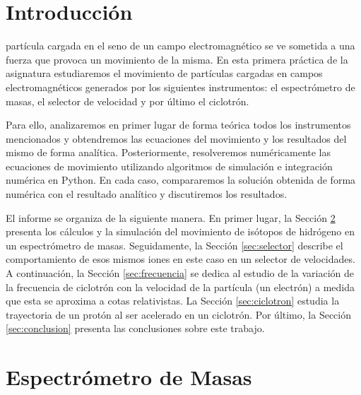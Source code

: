 \documentclass[journal]{IEEEtran}
\begin{document}
%
\IEEEpeerreviewmaketitle

\section{Introducción}

 partícula cargada en el seno de un campo electromagnético se ve sometida a una fuerza que provoca un movimiento de la misma. En esta primera práctica de la asignatura estudiaremos el movimiento de partículas cargadas en campos electromagnéticos generados por los siguientes instrumentos: el espectrómetro de masas, el selector de velocidad y por último el ciclotrón.

Para ello, analizaremos en primer lugar de forma teórica todos los instrumentos mencionados y obtendremos las ecuaciones del movimiento y los resultados del mismo de forma analítica. Posteriormente, resolveremos numéricamente las ecuaciones de movimiento utilizando algoritmos de simulación e integración numérica en Python. En cada caso, compararemos la solución obtenida de forma numérica con el resultado analítico y discutiremos los resultados.

El informe se organiza de la siguiente manera. En primer lugar, la Sección \ref{sec:espectrometro} presenta los cálculos y la simulación del movimiento de isótopos de hidrógeno en un espectrómetro de masas. Seguidamente, la Sección \ref{sec:selector} describe el comportamiento de esos mismos iones en este caso en un selector de velocidades. A continuación, la Sección \ref{sec:frecuencia} se dedica al estudio de la variación de la frecuencia de ciclotrón con la velocidad de la partícula (un electrón) a medida que esta se aproxima a cotas relativistas. La Sección \ref{sec:ciclotron} estudia la trayectoria de un protón al ser acelerado en un ciclotrón. Por último, la Sección \ref{sec:conclusion} presenta las conclusiones sobre este trabajo.

\newpage

\section{Espectrómetro de Masas}
\label{sec:espectrometro}
\end{document}
